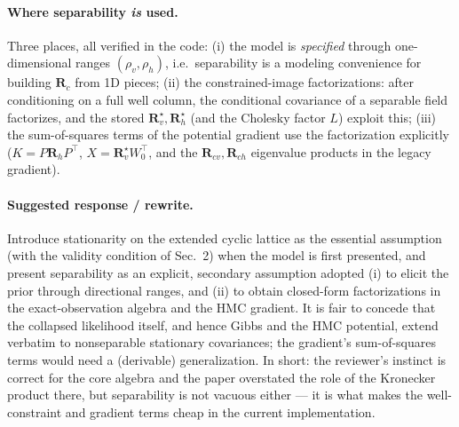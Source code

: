 \documentclass[11pt]{article}
\begin{document}
\paragraph{Where separability \emph{is} used.} Three places, all verified in
the code: (i) the model is \emph{specified} through one-dimensional ranges
$(\rho_v, \rho_h)$, i.e.\ separability is a modeling convenience for building
$\bm{R}_c$ from 1D pieces; (ii) the constrained-image factorizations: after
conditioning on a full well column, the conditional covariance of a separable
field factorizes, and the stored $\bm{R}_v^{\star}, \bm{R}_h^{\star}$ (and
the Cholesky factor $L$) exploit this; (iii) the sum-of-squares terms of the
potential gradient use the factorization explicitly
($K = P \bm{R}_h P^{\top}$, $X = \bm{R}_v^{\star} W_0^{\top}$, and the
$\bm{R}_{cv}, \bm{R}_{ch}$ eigenvalue products in the legacy gradient).

\paragraph{Suggested response / rewrite.} Introduce stationarity on the
extended cyclic lattice as the essential assumption (with the validity
condition of Sec.~2) when the model is first presented, and present
separability as an explicit, secondary assumption adopted (i) to elicit the
prior through directional ranges, and (ii) to obtain closed-form
factorizations in the exact-observation algebra and the HMC gradient. It is
fair to concede that the collapsed likelihood itself, and hence Gibbs and the
HMC potential, extend verbatim to nonseparable stationary covariances; the
gradient's sum-of-squares terms would need a (derivable) generalization. In
short: the reviewer's instinct is correct for the core algebra and the paper
overstated the role of the Kronecker product there, but separability is not
vacuous either --- it is what makes the well-constraint and gradient terms
cheap in the current implementation.
\end{document}
